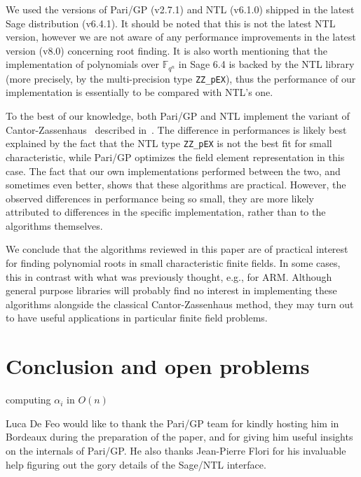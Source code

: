 \documentclass{sig-alternate}
\newcommand{\ff}[1]{\mathbb{F}_{#1}}
\newcommand{\qq}{q}
\newcommand{\nn}{n}
\newcommand{\qn}{{\qq^\nn}}
\newcommand{\extf}{\ff{\qn}}
\newcounter{algo}
\renewcommand{\paragraph}[1]{\smallskip\noindent{{\bf \rm #1.}}}
\begin{document}
We used the versions of Pari/GP (v2.7.1) and NTL (v6.1.0) shipped in
the latest Sage distribution (v6.4.1). It should be noted that this is
not the latest NTL version, however we are not aware of any
performance improvements in the latest version (v8.0) concerning root
finding. It is also worth mentioning that the implementation of
polynomials over $\extf$ in Sage 6.4 is backed by the NTL library
(more precisely, by the multi-precision type \texttt{ZZ\_pEX}), thus
the performance of our implementation is essentially to be compared
with NTL's one.

To the best of our knowledge, both Pari/GP and NTL implement the
variant of Cantor-Zassenhaus~\cite{cantor1981} described
in~\cite{GathenS92}. The difference in performances is likely best
explained by the fact that the NTL type \texttt{ZZ\_pEX} is not the
best fit for small characteristic, while Pari/GP optimizes the field
element representation in this case. The fact that our own
implementations performed between the two, and sometimes even better,
shows that these algorithms are practical. However, the observed
differences in performance being so small, they are more likely
attributed to differences in the specific implementation, rather than
to the algorithms themselves.

We conclude that the algorithms reviewed in this paper are of
practical interest for finding polynomial roots in small
characteristic finite fields. In some cases, this in contrast with
what was previously thought, e.g., for ARM. Although general purpose
libraries will probably find no interest in implementing these
algorithms alongside the classical Cantor-Zassenhaus method, they may
turn out to have useful applications in particular finite field
problems.



\section{Conclusion and open problems}

computing $\alpha_i$ in $O(n)$

\paragraph{Aknowledgements} Luca De Feo would like to thank the
Pari/GP team for kindly hosting him in Bordeaux during the preparation
of the paper, and for giving him useful insights on the internals of
Pari/GP. He also thanks Jean-Pierre Flori for his invaluable help
figuring out the gory details of the Sage/NTL interface.



\end{document}
